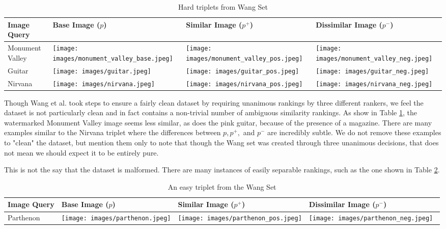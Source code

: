 \begin{table}
	\begin{tabular}{>{\centering\arraybackslash}m{1in} >{\centering\arraybackslash}m{1.4in} >{\centering\arraybackslash}m{1.4in} >{\centering\arraybackslash}m{1.4in}}
		\toprule
		\bfseries Image Query & \bfseries Base Image ($p$) & \bfseries Similar Image ($p^+$) & \bfseries Dissimilar Image ($p^-$) \\
		\midrule
		\centering Monument Valley & \texttt{[image: images/monument\_valley\_base.jpeg]} & \texttt{[image: images/monument\_valley\_pos.jpeg]} & \texttt{[image: images/monument\_valley\_neg.jpeg]}\\
		Guitar & \texttt{[image: images/guitar.jpeg]} & \texttt{[image: images/guitar\_pos.jpeg]} & \texttt{[image: images/guitar\_neg.jpeg]}\\
		Nirvana & \texttt{[image: images/nirvana.jpeg]} & \texttt{[image: images/nirvana\_pos.jpeg]} & \texttt{[image: images/nirvana\_neg.jpeg]}\\
		\bottomrule
	\end{tabular}
	\caption{Hard triplets from Wang Set}
	\label{table:hard_triplets}
\end{table}

Though Wang et al. took steps to ensure a fairly clean dataset by requiring unanimous rankings by three different rankers, we feel the dataset is not particularly clean and in fact contains a non-trivial number of ambiguous similarity rankings. As show in Table \ref{table:hard_triplets}, the watermarked Monument Valley image seems less similar, as does the pink guitar, because of the presence of a magazine. There are many examples similar to the Nirvana triplet where the differences between $p, p^+,$ and $p^-$ are incredibly subtle. We do not remove these examples to "clean" the dataset, but mention them only to note that though the Wang set was created through three unanimous decisions, that does not mean we should expect it to be entirely pure.

This is not the say that the dataset is malformed. There are many instances of easily separable rankings, such as the one shown in Table \ref{table:easy_triplet}.
\begin{table}
	\begin{tabular}{>{\centering\arraybackslash}m{1in} >{\centering\arraybackslash}m{1.4in} >{\centering\arraybackslash}m{1.4in} >{\centering\arraybackslash}m{1.4in}}
		\toprule
		\bfseries Image Query & \bfseries Base Image ($p$) & \bfseries Similar Image ($p^+$) & \bfseries Dissimilar Image ($p^-$) \\
		\midrule
		\centering Parthenon & \texttt{[image: images/parthenon.jpeg]} & \texttt{[image: images/parthenon\_pos.jpeg]} & \texttt{[image: images/parthenon\_neg.jpeg]}\
	\end{tabular}
	\caption{An easy triplet from the Wang Set}
	\label{table:easy_triplet}
\end{table}

